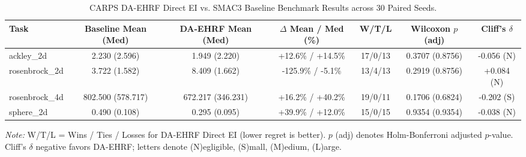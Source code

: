 \begin{table}[htbp]
\centering
\caption{CARPS DA-EHRF Direct EI vs. SMAC3 Baseline Benchmark Results across 30 Paired Seeds.}
\label{tab:carps_da_ehrf_direct_ei}
\small
\begin{tabular}{lcccccc}
\toprule
\textbf{Task} & \textbf{Baseline Mean (Med)} & \textbf{DA-EHRF Mean (Med)} & \textbf{$\Delta$ Mean / Med (\%)} & \textbf{W/T/L} & \textbf{Wilcoxon $p$ (adj)} & \textbf{Cliff's $\delta$} \\
\midrule
ackley\_2d & 2.230 (2.596) & 1.949 (2.220) & +12.6\% / +14.5\% & 17/0/13 & 0.3707 (0.8756) & -0.056 (N) \\
rosenbrock\_2d & 3.722 (1.582) & 8.409 (1.662) & -125.9\% / -5.1\% & 13/4/13 & 0.2919 (0.8756) & +0.084 (N) \\
rosenbrock\_4d & 802.500 (578.717) & 672.217 (346.231) & +16.2\% / +40.2\% & 19/0/11 & 0.1706 (0.6824) & -0.202 (S) \\
sphere\_2d & 0.490 (0.108) & 0.295 (0.095) & +39.9\% / +12.0\% & 15/0/15 & 0.9354 (0.9354) & -0.038 (N) \\
\bottomrule
\end{tabular}
\vspace{1mm}
{\raggedright \footnotesize \textit{Note:} W/T/L = Wins / Ties / Losses for DA-EHRF Direct EI (lower regret is better). $p$ (adj) denotes Holm-Bonferroni adjusted $p$-value. Cliff's $\delta$ negative favors DA-EHRF; letters denote (N)egligible, (S)mall, (M)edium, (L)arge.\par}
\end{table}
